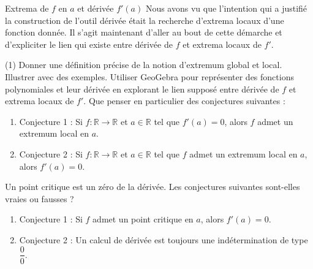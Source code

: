 \documentclass[a4paper,12pt]{article}
\begin{document}
\begin{activite}{Extrema de \(f\) en \(a\) et dérivée \(f'(a)\)}
\tcblower
Nous avons vu que l’intention qui a justifié la construction de l’outil dérivée était la recherche d’extrema locaux d’une fonction donnée. Il s’agit maintenant d’aller au bout de cette démarche et d’expliciter le lien qui existe entre dérivée de \(f\) et extrema locaux de \(f'\).

\begin{tasks}(1)
  \task Donner une définition précise de la notion d’extremum global et local. Illustrer avec des exemples.
  \task Utiliser GeoGebra pour représenter des fonctions polynomiales et leur dérivée en explorant le lien supposé entre dérivée de \(f\) et extrema locaux de \(f'\).
  \task Que penser en particulier des conjectures suivantes :
    \begin{enumerate}
      \item Conjecture 1 : Si \(f : \mathbb{R}\to\mathbb{R}\) et \(a\in\mathbb{R}\) tel que \(f'(a)=0\), alors \(f\) admet un extremum local en \(a\).
      \item Conjecture 2 : Si \(f : \mathbb{R}\to\mathbb{R}\) et \(a\in\mathbb{R}\) tel que \(f\) admet un extremum local en \(a\), alors \(f'(a)=0\).
    \end{enumerate}
  \task Un point critique est un zéro de la dérivée. Les conjectures suivantes sont-elles vraies ou fausses ?
    \begin{enumerate}
      \item Conjecture 1 : Si \(f\) admet un point critique en \(a\), alors \(f'(a)=0\).
      \item Conjecture 2 : Un calcul de dérivée est toujours une indétermination de type \(\dfrac{0}{0}\).
    \end{enumerate}
\end{tasks}
\end{activite}
\end{document}
